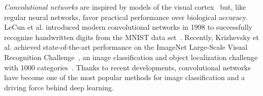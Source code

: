 \emph{Convolutional networks} are inspired by models of the visual cortex~\cite{Fukushima1980} but, like regular neural networks, favor practical performance over biological accuracy.
LeCun et al. introduced modern convolutional networks in 1998 to successfully recognize handwritten digits from the MNIST data set~\cite{LeCun1998}. Recently, Krizhevsky et al. achieved state-of-the-art performance on the ImageNet Large-Scale Visual Recognition Challenge~\cite{Krizhevsky2012}, an image classification and object localization challenge with 1000 categories~\cite{Russakovsky2015}.
Thanks to recent developments, convolutional networks have become one of the most popular methods for image classification and a driving force behind deep learning.



